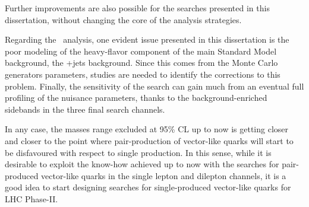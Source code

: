 Further improvements are also possible for the searches
presented in this dissertation, without changing the core of
the analysis strategies. 


Regarding the \htx\ analysis, one evident issue
presented in this dissertation is the poor modeling of the
heavy-flavor component of the main Standard Model background, the
\ttbar+jets background.
Since this comes from the Monte Carlo generators parameters, 
studies are needed to identify the corrections to this problem.
Finally, the sensitivity of the search can gain much from an
eventual full profiling of the nuisance parameters, thanks to the
background-enriched sidebands in the three final search channels.

In any case, the masses range excluded at 95\% CL up to now
is getting closer and closer to the point where pair-production
of vector-like quarks will start to be disfavoured with respect
to single production. In this sense, while it is desirable to
exploit the know-how achieved up to now with the searches for
pair-produced vector-like quarks in the single lepton and dilepton
channels, it is a good idea to start designing searches for
single-produced vector-like quarks for LHC Phase-II.
